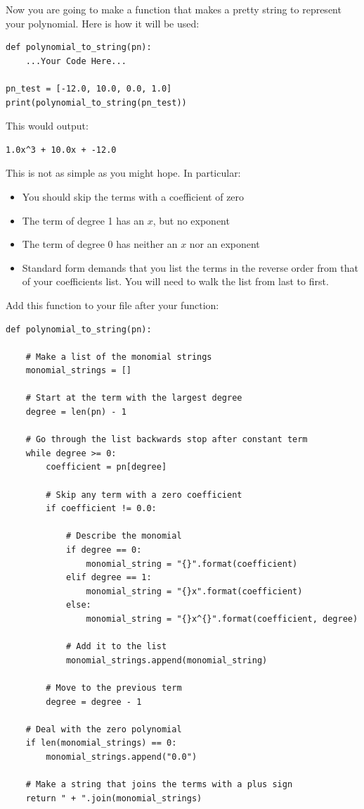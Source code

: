 Now you are going to make a function that makes a pretty string to
represent your polynomial. Here is how it will be used:
\begin{verbatim}
def polynomial_to_string(pn):
    ...Your Code Here...

pn_test = [-12.0, 10.0, 0.0, 1.0]
print(polynomial_to_string(pn_test))
\end{verbatim}

This would output:
\begin{verbatim}
1.0x^3 + 10.0x + -12.0
\end{verbatim}
This is not as simple as you might hope. In particular:
\begin{itemize}
\item You should skip the terms with a coefficient of zero
\item The term of degree 1 has an $x$, but no exponent
\item The term of degree 0 has neither an $x$ nor an exponent
\item Standard form demands that you list the terms in the reverse
  order from that of your coefficients list. You will need to walk the
  list from last to first.
\end{itemize}

Add this function to your  file after your  function:
\begin{verbatim}
def polynomial_to_string(pn):
    
    # Make a list of the monomial strings
    monomial_strings = []

    # Start at the term with the largest degree
    degree = len(pn) - 1

    # Go through the list backwards stop after constant term
    while degree >= 0:
        coefficient = pn[degree]

        # Skip any term with a zero coefficient
        if coefficient != 0.0:

            # Describe the monomial
            if degree == 0:
                monomial_string = "{}".format(coefficient)
            elif degree == 1:
                monomial_string = "{}x".format(coefficient)
            else:
                monomial_string = "{}x^{}".format(coefficient, degree)
                
            # Add it to the list
            monomial_strings.append(monomial_string)

        # Move to the previous term
        degree = degree - 1

    # Deal with the zero polynomial
    if len(monomial_strings) == 0:
        monomial_strings.append("0.0")
    
    # Make a string that joins the terms with a plus sign
    return " + ".join(monomial_strings)
\end{verbatim}

